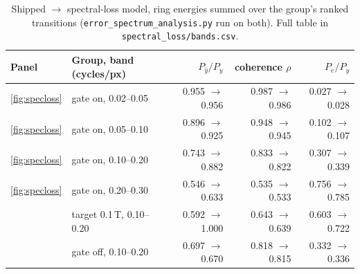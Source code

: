 \documentclass[10pt,a4paper]{article}
\begin{document}
\begin{table}[H]
\centering\small
\begin{tabular}{llrrr}
\toprule
Panel & Group, band (cycles/px) & $P_{\hat y}/P_y$ & coherence $\rho$ & $P_e/P_y$ \\
\midrule
\ref{fig:specloss} & gate on, 0.02--0.05 & 0.955 $\to$ 0.956 & 0.987 $\to$ 0.986 & 0.027 $\to$ 0.028 \\
\ref{fig:specloss} & gate on, 0.05--0.10 & 0.896 $\to$ 0.925 & 0.948 $\to$ 0.945 & 0.102 $\to$ 0.107 \\
\ref{fig:specloss} & gate on, 0.10--0.20 & 0.743 $\to$ 0.882 & 0.833 $\to$ 0.822 & 0.307 $\to$ 0.339 \\
\ref{fig:specloss} & gate on, 0.20--0.30 & 0.546 $\to$ 0.633 & 0.535 $\to$ 0.533 & 0.756 $\to$ 0.785 \\
                   & target 0.1\,T, 0.10--0.20 & 0.592 $\to$ 1.000 & 0.643 $\to$ 0.639 & 0.603 $\to$ 0.722 \\
                   & gate off, 0.10--0.20 & 0.697 $\to$ 0.670 & 0.818 $\to$ 0.815 & 0.332 $\to$ 0.336 \\
\bottomrule
\end{tabular}
\caption{Shipped $\to$ spectral-loss model, ring energies summed over the group's ranked
transitions (\texttt{error\_spectrum\_analysis.py} run on both). Full table in
\texttt{spectral\_loss/bands.csv}.}
\label{tab:specbands}
\end{table}
\end{document}
